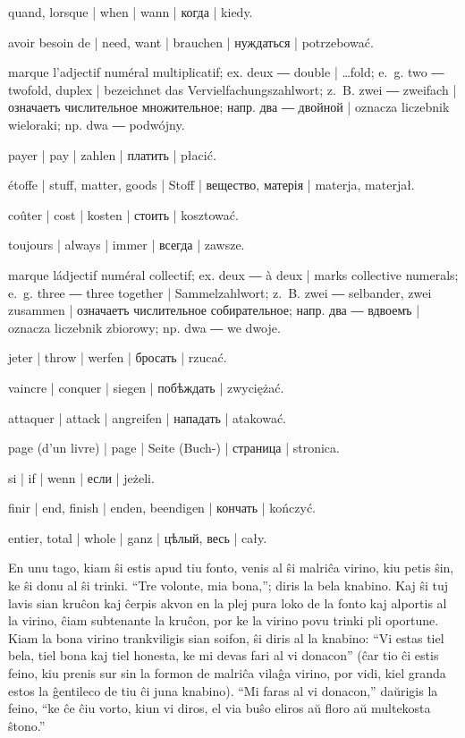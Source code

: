 \begin{ekzvocab}{1em}
 quand, lorsque | when | wann | когда | kiedy.

 avoir besoin de | need, want | brauchen | нуждаться | potrzebować.

 marque l’adjectif numéral multiplicatif; ex.  deux ―  double | \ldots{}fold; e.~g.  two ―  twofold, duplex | bezeichnet das Vervielfachungszahlwort; z.~B.  zwei ―  zweifach | означаетъ числительное множительное; напр.  два ―  двойной | oznacza liczebnik wieloraki; np.  dwa ―  podwójny.

 payer | pay | zahlen | платить | płacić.

 étoffe | stuff, matter, goods | Stoff | вещество, матерія | materja, materjał.

 coûter | cost | kosten | стоить | kosztować.

 toujours | always | immer | всегда | zawsze.

 marque ládjectif numéral collectif; ex.  deux ―  à deux | marks collective numerals; e.~g.  three ―  three together | Sammelzahlwort; z.~B.  zwei ―  selbander, zwei zusammen | означаетъ числительное собирательное; напр.  два ―  вдвоемъ | oznacza liczebnik zbiorowy; np.  dwa ―  we dwoje.

 jeter | throw | werfen | бросать | rzucać.

 vaincre | conquer | siegen | побѣждать | zwyciężać.

 attaquer | attack | angreifen | нападать | atakować.

 page (d’un livre) | page | Seite (Buch-) | страница | stronica.

 si | if | wenn | если | jeżeli.

 finir | end, finish | enden, beendigen | кончать | kończyć.

 entier, total | whole | ganz | цѣлый, весь | cały.

\end{ekzvocab}



En unu tago, kiam ŝi estis apud tiu fonto, venis al ŝi malriĉa virino, kiu petis ŝin, ke ŝi donu al ŝi trinki. “Tre volonte, mia bona,”; diris la bela knabino. Kaj ŝi tuj lavis sian kruĉon kaj ĉerpis akvon en la plej pura loko de la fonto kaj alportis al la virino, ĉiam subtenante la kruĉon, por ke la virino povu trinki pli oportune. Kiam la bona virino trankviligis sian soifon, ŝi diris al la knabino: “Vi estas tiel bela, tiel bona kaj tiel honesta, ke mi devas fari al vi donacon” (ĉar tio ĉi estis feino, kiu prenis sur sin la formon de malriĉa vilaĝa virino, por vidi, kiel granda estos la ĝentileco de tiu ĉi juna knabino). “Mi faras al vi donacon,” daŭrigis la feino, “ke ĉe ĉiu vorto, kiun vi diros, el via buŝo eliros aŭ floro aŭ multekosta ŝtono.”

